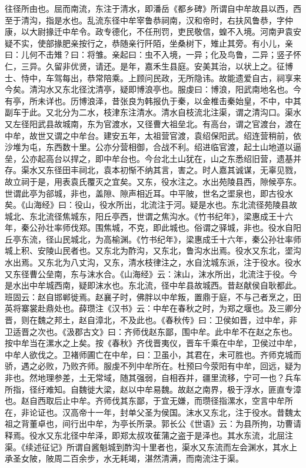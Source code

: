 \documentclass[12pt,UTF8]{ctexbook}
\begin{document}
往径所由也。屈而南流，东注于清水，即潘岳《都乡碑》所谓自中牟故县以西，西至于清沟，指是水也。乱流东径中牟宰鲁恭祠南，汉和帝时，右扶风鲁恭，字仲康，以大尉掾迁中牟令。政专德化，不任刑罚，吏民敬信，蝗不入境。河南尹袁安疑不实，使部掾肥亲按行之，恭随亲行阡陌，坐桑树下，雉止其旁。有小儿，亲曰：儿何不击雉？曰：将雏。亲起曰：虫不入境，一异；化及鸟鲁，二异；竖子怀仁，三异。久留非优贤，请还。是年，嘉禾生县庭。安美其治，以状上之。征博士、恃中，车驾每出，恭常陪乘。上顾问民政，无所隐讳。故能遗爱自古，祠享来今矣。清沟水又东北径沈清亭，疑即博浪亭也。服虔曰：博浪，阳武南地名也。今有亭，所未详也。历博浪泽，昔张良为韩报仇于秦，以金椎击秦始皇，不中，中其副车于此。又北分为二水，枝津东注清水。清水自枝流北注渠，谓之清沟口。渠水又左径阳武县故城南，东为官渡水，又径曹大祖垒北。有高台，谓之官渡台，渡在中牟，故世又谓之中牟台。建安五年，太祖营官渡，袁绍保阳武。绍连营稍前，依沙堆为屯，东西数十里。公亦分营相御，合战不利。绍进临官渡，起土山地道以逼垒，公亦起高台以捍之，即中牟台也。今台北土山犹在，山之东悉绍旧营，遗基并存。渠水又东径田丰祠北，袁本初惭不纳其言，害之。时人嘉其诚谋，无辜见戮，故立祠于是，用表袁氏覆灭之宜矣。又东，役水注之。水出苑陵县西，隙候亭东。世谓此亭为郤城，非也，盖隙、隙声相近耳。中平陂，世名之埿泉也，即古役水矣。《山海经》曰：役山，役水所出，北流注于河。疑是水也。东北流径苑陵县故城北、东北流径焦城东，阳丘亭西，世谓之焦沟水。《竹书纪年》，梁惠成王十六年，秦公孙壮率师伐郑。围焦城，不克，即此城也。俗谓之驿城，非也。役水自阳丘亭东流，径山民城北，为高榆渊。《竹书纪年》，梁惠成壬十六年，秦公孙壮率师城上积、安陵山民者也。又东北为酢沟，又东北，鲁沟水出焉。役水又东北，埿沟水出焉。又东北为八丈沟，又东，清水枝律注之，水自沈城东派，注于役水。役水又东径曹公垒南，东与沫水合。《山海经》云：沫山，沫水所出，北流注于役。今是水出中牟城西南，疑即沫水也。东北流，径中牟县故城西。昔赵献侯自耿都此。班固云：赵自邯郸徙焉。赵襄子时，佛胖以中牟叛，置鼎于庭，不与己者烹之，田英将寨裳赴鼎处也。薛瓒注《汉书》云：中牟在春秋之时，为郑之堰也。及三卿分晋，则在魏之邦土，赵自漳北，不及此也。《春秋传》曰：卫侯如晋，过中牟，非卫适晋之次也。《汲郡古文》曰：齐师伐赵东鄙，围中牟。此中牟不在赵之东也。按中牟当在漯水之上矣。按《春秋》齐伐晋夷仪，晋车千乘在中牟，卫侯过中牟，中牟人欲伐之。卫褚师圃亡在中牟，曰：卫虽小，其君在，未可胜也。齐师克城而骄，遇之必败，乃败齐师。服虔不列中牟所在。杜预曰今荥阳有中牟，回远，疑为非也。然地理参差，土无常域，随其强弱，自相吞并，疆里流移，宁可一也？兵车所指，径纡难知。自魏徙大梁，赵以中牟易魏。故赵之南界，极于浮水，匪直专漳也。赵自西取后止中牟。齐师伐其东鄙，于宜无嫌，而瓒径指漯水，空言中牟所在，非论证也。汉高帝十一年，封单父圣为侯国。沫水又东北，注于役水。昔魏太祖之背董卓也，间行出中牟，为亭长所录。郭长公《世语》云：为县所拘，功曹请释焉。役水又东北径中牟泽，即郑太叔攻萑蒲之盗于是泽也。其水东流，北屈注渠。《续述征记》所谓自酱魁城到酢沟十里者也，渠水又东流而左会渊水，其水上承圣女陂，陂周二百余步，水无耗竭，湛然清满，而南流注于渠。
\end{document}
